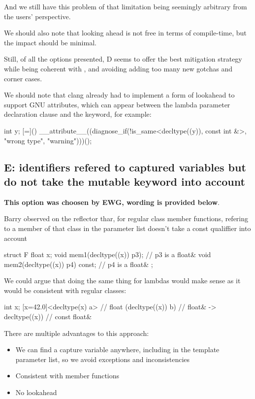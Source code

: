 \documentclass{wg21}
\begin{document}
And we still have this problem of that limitation being seemingly arbitrary from the users' perspective.

We should also note that looking ahead is not free in terms of compile-time, but the impact should be minimal.

Still, of all the options presented, D seems to offer the best mitigation strategy while being
coherent with , and avoiding adding too many new gotchas and corner cases.

We should note that clang already had to implement a form of lookahead to support GNU attributes, which can appear between the
lambda parameter declaration clause and the  keyword, for example:

\begin{colorblock}
int y;
[=]() __attribute__((diagnose_if(!is_same<decltype((y)), const int &>, "wrong type", "warning"))){}();
\end{colorblock}


\subsection{E: identifiers refered to captured variables but do not take the mutable keyword into account}

\textbf{This option was choosen by EWG, wording is provided below}.

Barry observed on the reflector thar, for regular class member functions, refering to a member of that class in the parameter list
doesn't take a const qualiffier into account

\begin{colorblock}
struct F {
    float x;
    void mem1(decltype((x)) p3);       // p3 is a float&
    void mem2(decltype((x)) p4) const; // p4 is a float&
};
\end{colorblock}

We could argue that doing the same thing for lambdas would make sense as it would be consistent with regular classes:


\begin{colorblock}
int x;
[x=42.0]<decltype(x) a> // float 
(decltype((x)) b)       // float&    
-> decltype((x))        // const float&    
\end{colorblock}


There are multiple advantages to this approach:

\begin{itemize}
\item We can find a capture variable anywhere, including in the template parameter list, so we avoid exceptions and inconsistencies
\item Consistent with member functions
\item No lookahead
\end{itemize}
\end{document}
